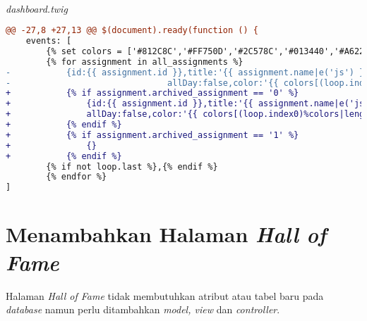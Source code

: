 ~\\
\textit{dashboard.twig}
\begin{lstlisting}[language=diff, basicstyle=\ttfamily, frame=single,
columns=fullflexible, keepspaces=true, breaklines=true]
@@ -27,8 +27,13 @@ $(document).ready(function () {
	events: [
		{% set colors = ['#812C8C','#FF750D','#2C578C','#013440','#A6222C','#42758C','#02A300','#BA6900'] %}
		{% for assignment in all_assignments %}
-       	{id:{{ assignment.id }},title:'{{ assignment.name|e('js') }}', start:'{{ assignment.start_time }}', end:' {{ assignment.finish_time }}',
-                               allDay:false,color:'{{ colors[(loop.index0)%colors|length] }}'}
+       	{% if assignment.archived_assignment == '0' %}
+           	{id:{{ assignment.id }},title:'{{ assignment.name|e('js') }}', start:'{{ assignment.start_time }}', end:' {{ assignment.finish_time }}',
+               allDay:false,color:'{{ colors[(loop.index0)%colors|length] }}'}
+        	{% endif %}
+        	{% if assignment.archived_assignment == '1' %}
+           	{}
+        	{% endif %}
		{% if not loop.last %},{% endif %}
		{% endfor %}
]
\end{lstlisting}

\section{Menambahkan Halaman \textit{Hall of Fame}}
Halaman \textit{Hall of Fame} tidak membutuhkan atribut atau tabel baru pada \textit{database} namun perlu ditambahkan \textit{model, view} dan \textit{controller}.

